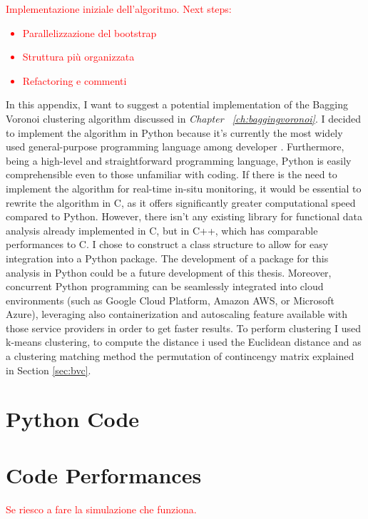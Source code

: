 \textcolor{red}{Implementazione iniziale dell'algoritmo. Next steps:
\begin{itemize}
    \item Parallelizzazione del bootstrap
    \item Struttura più organizzata
    \item Refactoring e commenti
\end{itemize}}
In this appendix, I want to suggest a potential implementation of the Bagging Voronoi clustering algorithm discussed in \emph{Chapter ~\ref{ch:baggingvoronoi}}. I decided to implement the algorithm in Python because it's currently the most widely used general-purpose programming language among developer \cite{lionel_sujay_vailshery_most_2023}. Furthermore, being a high-level and straightforward programming language, Python is easily comprehensible even to those unfamiliar with coding. If there is the need to implement the algorithm for real-time in-situ monitoring, it would be essential to rewrite the algorithm in C, as it offers significantly greater computational speed compared to Python. However, there isn't any existing library for functional data analysis already implemented in C, but in C++, which has comparable performances to C. I chose to construct a class structure to allow for easy integration into a Python package. The development of a package for this analysis in Python could be a future development of this thesis. Moreover, concurrent Python programming can be seamlessly integrated into cloud environments (such as Google Cloud Platform, Amazon AWS, or Microsoft Azure), leveraging also containerization and autoscaling feature available with those service providers in order to get faster results. To perform clustering I used k-means clustering, to compute the distance i used the Euclidean distance and as a clustering matching method the permutation of contincengy matrix explained in Section \ref{sec:bvc}.
\section{Python Code}
%

\section{Code Performances}
\textcolor{red}{Se riesco a fare la simulazione che funziona.}